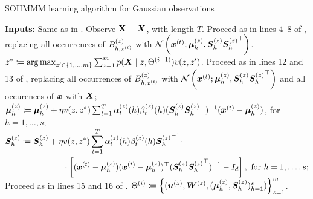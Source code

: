 \begin{algorithm}
    \caption{SOHMMM learning algorithm for Gaussian observations}
    \label{alg:sohmmm_gaussian}

    \begin{algorithmic}[1]
        \State \textbf{Inputs:} Same as in .
        \vspace{0.3cm}
        \vspace{0.3cm}
        \State Observe ${\mathbf{X}} = {\bm{X}}$, with length $T$.
        \vspace{0.3cm}
        \State Proceed as in lines 4--8 of , replacing all occurrences of ${B}^{(z)}_{h,x^{(t)}}$ with $\mathcal{N}\left({\bm{x}}^{(t)}; {\bm{\mu}}^{(z)}_h, {\bm{S}}^{(z)}_h {{\bm{S}}^{(z)}_h}^\top\right)$.
        \vspace{0.3cm}
        \State $z^* \coloneqq  \operatorname*{arg\,max}_{z' \in \{1,\dots,m\}} \sum_{z=1}^m p({\bm{X}} \mid z, \Theta^{(i-1)})v(z, z')$.
        \vspace{0.3cm}
        \vspace{0.3cm}
        \State Proceed as in lines 12 and 13 of , replacing all occurrences of ${B}^{(z)}_{h,x^{(t)}}$ with $\mathcal{N}\left({\bm{x}}^{(t)}; {\bm{\mu}}^{(z)}_h, {\bm{S}}^{(z)}_h {{\bm{S}}^{(z)}_h}^\top\right)$ and all occurences of ${\bm{x}}$ with ${\bm{X}}$;
        \vspace{0.3cm}
        \State ${\bm{\mu}}^{(z)}_h \coloneqq {\bm{\mu}}^{(z)}_h + \eta v(z, z^*) \sum_{t=1}^T \alpha_{t}^{(z)}(h) \beta_{t}^{(z)}(h) ({\bm{S}}^{(z)}_h {{\bm{S}}^{(z)}_h} ^\top)^{-1} ({\bm{x}}^{(t)} - {\bm{\mu}}^{(z)}_h)$, for $h = 1, \dots, s$;
        \vspace{0.3cm}
        \State $\begin{aligned}
            {\bm{S}}^{(z)}_h \coloneqq {\bm{S}}^{(z)}_h + \eta &v(z, z^*) \sum_{t=1}^T \alpha_{t}^{(z)}(h) \beta_{t}^{(z)}(h) {{\bm{S}}^{(z)}_h}^{-1} \cdot \\
            &\cdot \left[ ({\bm{x}}^{(t)} - {\bm{\mu}}^{(z)}_h) ({\bm{x}}^{(t)} - {\bm{\mu}}^{(z)}_h)^\top ({\bm{S}}^{(z)}_h {{\bm{S}}^{(z)}_h} ^\top)^{-1} - I_d\right],\text{ for }h = 1, \dots, s;
        \end{aligned}$
        \vspace{0.3cm}
        \State Proceed as in lines 15 and 16 of .
        \vspace{0.3cm}
        \EndFor
        \vspace{0.3cm}
        \State $\Theta^{(i)} \coloneqq \left\lbrace ({\bm{u}}^{(z)}, {\bm{W}}^{(z)}, ({\bm{\mu}}^{(z)}_h, {\bm{S}}^{(z)}_h)_{h=1}^s) \right\rbrace_{z=1}^m$.
        \vspace{0.3cm}
        \EndFor

    \end{algorithmic}
\end{algorithm}

